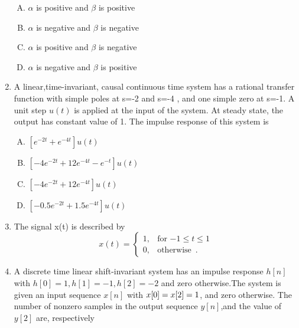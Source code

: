 \documentclass[journal,12pt,twocolumn]{IEEEtran}
\begin{document}
\begin{enumerate}
\begin{enumerate}[(A)]
\item $\alpha$ is positive and $\beta$ is positive
\item $\alpha$ is negative and $\beta$ is negative
\item $\alpha$ is positive and $\beta$ is negative
\item $\alpha$ is negative and $\beta$ is positive


\end{enumerate}

\item A linear,time-invariant, causal continuous time system has a rational transfer function with simple poles at s=-2 and s=-4 , and one simple zero at s=-1. A unit step $u(t)$ is applied at the input of the system. At steady state, the output has constant value of 1. The impulse response of this system is\\
\begin{enumerate}[(A)]

\setlength\itemsep{1.5em}

\item $[e^{-2t}+e^{-4t}]u(t)$
\item $[-4e^{-2t}+12 e^{-4t}-e^{-t}]u(t)$
\item $[-4e^{-2t}+12e^{-4t}]u(t)$
\item $[-0.5e^{-2t}+1.5e^{-4t}]u(t)$

\end{enumerate}


\item The signal x(t) is described by
\[
	x(t)=\begin{cases}
		1, & \text{for $-1\leq t \leq 1$}  \\
		0, & \text{otherwise }\,.
	\end{cases}
\]
\begin{enumerate}[(A)]
\end{enumerate}

\item A discrete time linear shift-invariant system has an impulse response $h[n]$ with $h[0]=1,h[1]=-1, h[2]=-2$ and zero otherwise.The system is given an input sequence $x[n]$ with $x[0]=x[2]=\-1$, and zero otherwise. The number of nonzero samples in the output sequence $y[n]$,and the value of $y[2]$ are, respectively\\
\begin{enumerate}[(A)]
\begin{multicols}{2}
\setlength\itemsep{2em}


\end{multicols}
\end{enumerate}
\end{enumerate}
\end{document}
